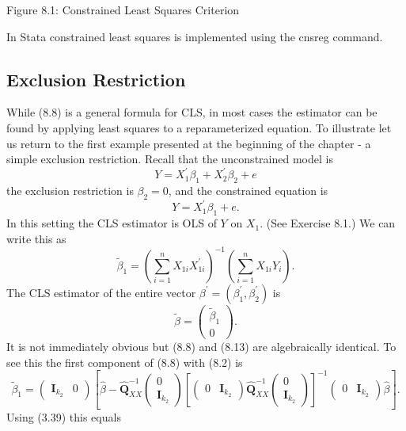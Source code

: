 \documentclass[10pt]{article}
\begin{document}
Figure 8.1: Constrained Least Squares Criterion

In Stata constrained least squares is implemented using the cnsreg command.

\subsection{Exclusion Restriction}
While (8.8) is a general formula for CLS, in most cases the estimator can be found by applying least squares to a reparameterized equation. To illustrate let us return to the first example presented at the beginning of the chapter - a simple exclusion restriction. Recall that the unconstrained model is
$$
Y=X_{1}^{\prime} \beta_{1}+X_{2}^{\prime} \beta_{2}+e
$$
the exclusion restriction is $\beta_{2}=0$, and the constrained equation is
$$
Y=X_{1}^{\prime} \beta_{1}+e .
$$
In this setting the CLS estimator is OLS of $Y$ on $X_{1}$. (See Exercise 8.1.) We can write this as
$$
\widetilde{\beta}_{1}=\left(\sum_{i=1}^{n} X_{1 i} X_{1 i}^{\prime}\right)^{-1}\left(\sum_{i=1}^{n} X_{1 i} Y_{i}\right) .
$$
The CLS estimator of the entire vector $\beta^{\prime}=\left(\beta_{1}^{\prime}, \beta_{2}^{\prime}\right)$ is
$$
\widetilde{\beta}=\left(\begin{array}{c}
\widetilde{\beta}_{1} \\
0
\end{array}\right) .
$$
It is not immediately obvious but (8.8) and (8.13) are algebraically identical. To see this the first component of (8.8) with (8.2) is
$$
\widetilde{\beta}_{1}=\left(\begin{array}{ll}
\boldsymbol{I}_{k_{2}} & 0
\end{array}\right)\left[\widehat{\beta}-\widehat{\boldsymbol{Q}}_{X X}^{-1}\left(\begin{array}{c}
0 \\
\boldsymbol{I}_{k_{2}}
\end{array}\right)\left[\left(\begin{array}{ll}
0 & \boldsymbol{I}_{k_{2}}
\end{array}\right) \widehat{\boldsymbol{Q}}_{X X}^{-1}\left(\begin{array}{c}
0 \\
\boldsymbol{I}_{k_{2}}
\end{array}\right)\right]^{-1}\left(\begin{array}{cc}
0 & \boldsymbol{I}_{k_{2}}
\end{array}\right) \widehat{\beta}\right] .
$$
Using (3.39) this equals
\end{document}
